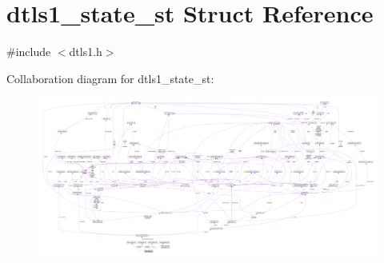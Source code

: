 \hypertarget{structdtls1__state__st}{}\section{dtls1\+\_\+state\+\_\+st Struct Reference}
\label{structdtls1__state__st}


{\ttfamily \#include $<$dtls1.\+h$>$}



Collaboration diagram for dtls1\+\_\+state\+\_\+st\+:\nopagebreak
\begin{figure}[H]
\begin{center}
\leavevmode
\includegraphics[width=350pt]{structdtls1__state__st__coll__graph}
\end{center}
\end{figure}
